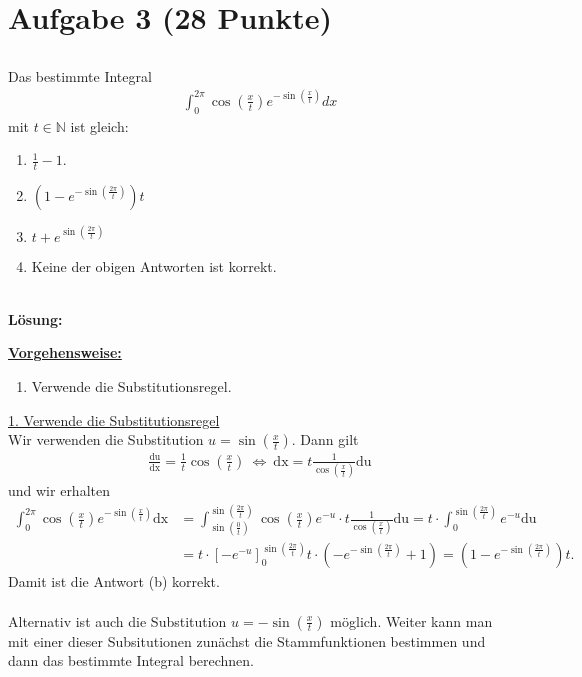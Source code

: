 \section*{Aufgabe 3 (28 Punkte)}
\vspace{0.4cm}
\subsection*{}
Das bestimmte Integral
\begin{align*}
	\int_0^{2\pi} \cos \left(\frac{x}{t}\right) e^{- \sin(\frac{x}{t})} dx
\end{align*}
mit $ t \in \mathbb{N} $ ist gleich:

\renewcommand{\labelenumi}{(\alph{enumi})}
\begin{enumerate}
	\item 
	$ \frac{1}{t} -1  $.
	\item
	$ (1 - e^{-\sin\left(\frac{2\pi}{t}\right)})t $
	\item
	$ t + e^{\sin\left(\frac{2\pi}{t}\right)} $
	\item 
	Keine der obigen Antworten ist korrekt.
\end{enumerate}
\ \\
\textbf{Lösung:}
\begin{mdframed}
\underline{\textbf{Vorgehensweise:}}
\renewcommand{\labelenumi}{\theenumi.}
\begin{enumerate}
\item Verwende die Substitutionsregel.
\end{enumerate}
\end{mdframed}

\underline{1. Verwende die Substitutionsregel}\\
Wir verwenden die Substitution $u = \sin\left(\frac{x}{t}\right)$. Dann gilt
\begin{align*}
	\frac{\mathrm{du}}{\mathrm{dx}} =\frac{1}{t} \cos\left(\frac{x}{t}\right)
	\ \Leftrightarrow \
	\mathrm{dx} = t \frac{1}{\cos\left(\frac{x}{t}\right)} \mathrm{du}
\end{align*}
und wir erhalten 
\begin{align*}
	\int_0^{2\pi} \cos \left(\frac{x}{t}\right) e^{- \sin(\frac{x}{t})} \mathrm{dx}
	&=
	\int_{\sin\left(\frac{0}{t}\right)}^{\sin\left(\frac{2\pi}{t}\right)} \cos\left(\frac{x}{t}\right) e^{-u}\cdot  t \frac{1}{\cos\left(\frac{x}{t}\right)} \mathrm{du}
	=
	t\cdot\int_{0}^{\sin\left(\frac{2\pi}{t}\right)} e^{-u}  \mathrm{du}\\
	&=
	t \cdot \left[-e^{-u}\right]_0^{\sin\left(\frac{2\pi}{t}\right)}
	t \cdot \left(-e^{-\sin\left(\frac{2\pi}{t}\right)} + 1\right)
	=
	\left(1 - e^{-\sin\left(\frac{2\pi}{t}\right)}\right)t.
\end{align*}
Damit ist die Antwort (b) korrekt.\\
\\
Alternativ ist auch die Substitution $u = - \sin\left(\frac{x}{t}\right)$ möglich. Weiter kann man mit einer dieser Subsitutionen zunächst die Stammfunktionen bestimmen und dann das bestimmte Integral berechnen.

